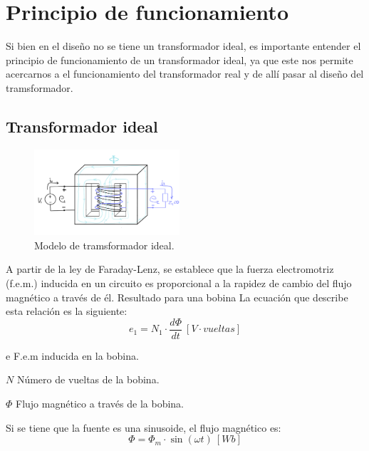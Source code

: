 \section{Principio de funcionamiento} 
Si bien en el diseño no se tiene un transformador ideal, es importante entender el principio de funcionamiento de un transformador ideal, ya que este nos permite acercarnos a el funcionamiento del transformador real y de allí pasar al diseño del tramsformador.

\subsection{Transformador ideal}

\begin{figure}[ht!]
    \centering
    \includegraphics[width=0.48\textwidth]{fot/T4.png}
    \caption{Modelo de tramsformador ideal.}
    \label{fig:T4}
\end{figure}

A partir de la ley de Faraday-Lenz, se establece que la fuerza electromotriz (f.e.m.) inducida en un circuito es proporcional a la rapidez de cambio del flujo magnético a través de él. Resultado para una bobina La ecuación que describe esta relación es la siguiente:
\begin{equation}
    \label{eqn1}
    e_1 = N_1 \cdot \frac{d\Phi}{dt}\ [V\cdot vueltas]
\end{equation}


\begin{IEEEdescription}[\IEEEsetlabelwidth{$V_1,V_2,$}]
\item[e] F.e.m inducida en la bobina.
\mbox{}
\item[$N$] Número de vueltas de la bobina.
\item[$\Phi$] Flujo magnético a través de la bobina.
\end{IEEEdescription}

\vspace{0.5cm}
Si se tiene que la fuente es una sinusoide, el flujo magnético es:
\begin{equation}
    \Phi = \Phi_m \cdot \sin(\omega t)\   [Wb]
\end{equation}

